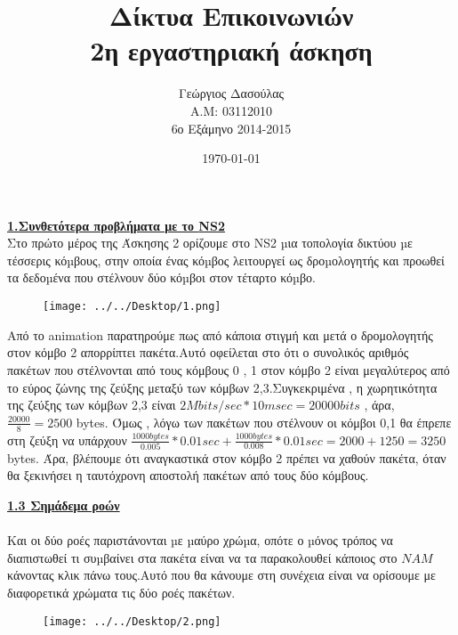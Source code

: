 \documentclass{article}%
\begin{document}

\title{Δίκτυα Επικοινωνιών\\2η εργαστηριακή άσκηση}
\author{Γεώργιος Δασούλας\\Α.Μ: 03112010 \\ 6ο Εξάμηνο 2014-2015  }
\date{\today}
\maketitle

\textbf{{\underline{1.Συνθετότερα προβλήματα με το  \textlatin{NS2} }}} \\

Στο πρώτο μέρος της Άσκησης 2 ορίζουμε στο \textlatin{NS2} µια τοπολογία δικτύου µε τέσσερις κόµβους, στην
οποία ένας κόµβος λειτουργεί ως δροµολογητής και προωθεί τα δεδοµένα που στέλνουν δύο κόµβοι στον
τέταρτο κόµβο.
\begin{figure}[htbp]
	\centering
		\texttt{[image: ../../Desktop/1.png]}
	\label{fig:1}
\end{figure}

Από το \textlatin{animation} παρατηρούμε πως από κάποια στιγμή και μετά ο δρομολογητής στον κόμβο 2 απορρίπτει πακέτα.Αυτό οφείλεται στο ότι ο συνολικός αριθμός πακέτων που στέλνονται από τους κόμβους 0 , 1 στον κόμβο 2 είναι μεγαλύτερος από το εύρος ζώνης της ζεύξης μεταξύ των κόμβων 2,3.Συγκεκριμένα , η χωρητικότητα της ζεύξης των κόμβων 2,3 είναι $2 Mbits/sec * 10 msec = 20000 bits$ , άρα, $\frac{20000}{8}=2500$ \textlatin{bytes}. Όμως , λόγω των πακέτων που στέλνουν οι κόμβοι 0,1 θα έπρεπε στη ζεύξη να υπάρχουν $\frac{1000 bytes}{0.005}*0.01sec + \frac{1000 bytes}{0.008} * 0.01sec = 2000+ 1250 = 3250$ \textlatin{bytes}. Άρα, βλέπουμε ότι αναγκαστικά στον κόμβο 2 πρέπει να χαθούν πακέτα, όταν θα ξεκινήσει η ταυτόχρονη αποστολή πακέτων από τους δύο κόμβους. \newpage


\textbf{{\underline{1.3 Σημάδεμα ροών  }}} \\\\
Και οι δύο ροές παριστάνονται µε µαύρο χρώµα, οπότε ο µόνος τρόπος να διαπιστωθεί τι συµβαίνει στα
πακέτα είναι να τα παρακολουθεί κάποιος στο $NAM$ κάνοντας κλικ πάνω τους.Αυτό που θα κάνουμε στη συνέχεια είναι να ορίσουμε με διαφορετικά χρώματα τις δύο ροές πακέτων.

\begin{figure}[htbp]
	\centering
		\texttt{[image: ../../Desktop/2.png]}
	\label{fig:2}
\end{figure}
\end{document}
